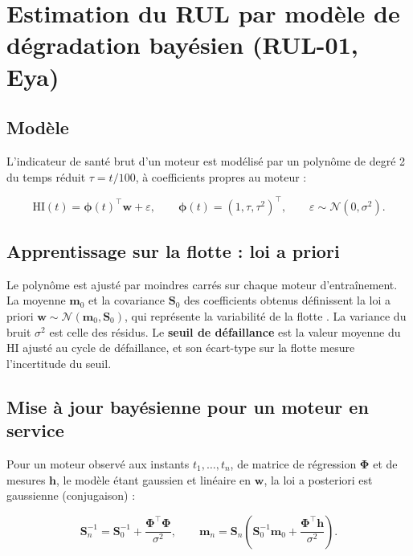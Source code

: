 \section{Estimation du RUL par modèle de dégradation bayésien (RUL-01, Eya)}\label{sec:degradation}

\subsection{Modèle}

L'indicateur de santé brut d'un moteur est modélisé par un polynôme de degré 2 du temps réduit $\tau = t/100$, à coefficients propres au moteur :

\begin{equation}\label{eq:degradation}
\mathrm{HI}(t) = \boldsymbol\phi(t)^\top \mathbf w + \varepsilon, \qquad \boldsymbol\phi(t) = (1, \tau, \tau^2)^\top, \qquad \varepsilon \sim \mathcal N(0, \sigma^2).
\end{equation}

\subsection{Apprentissage sur la flotte : loi a priori}

Le polynôme est ajusté par moindres carrés sur chaque moteur d'entraînement. La moyenne $\mathbf m_0$ et la covariance $\mathbf S_0$ des coefficients obtenus définissent la loi a priori $\mathbf w \sim \mathcal N(\mathbf m_0, \mathbf S_0)$, qui représente la variabilité de la flotte \cite{gebraeel2005}. La variance du bruit $\sigma^2$ est celle des résidus. Le \textbf{seuil de défaillance} est la valeur moyenne du HI ajusté au cycle de défaillance, et son écart-type sur la flotte mesure l'incertitude du seuil.

\subsection{Mise à jour bayésienne pour un moteur en service}

Pour un moteur observé aux instants $t_1, \dots, t_n$, de matrice de régression $\boldsymbol\Phi$ et de mesures $\mathbf h$, le modèle étant gaussien et linéaire en $\mathbf w$, la loi a posteriori est gaussienne (conjugaison) :

\begin{equation}\label{eq:posterior}
\mathbf S_n^{-1} = \mathbf S_0^{-1} + \frac{\boldsymbol\Phi^\top \boldsymbol\Phi}{\sigma^2}, \qquad \mathbf m_n = \mathbf S_n \left(\mathbf S_0^{-1} \mathbf m_0 + \frac{\boldsymbol\Phi^\top \mathbf h}{\sigma^2}\right).
\end{equation}

